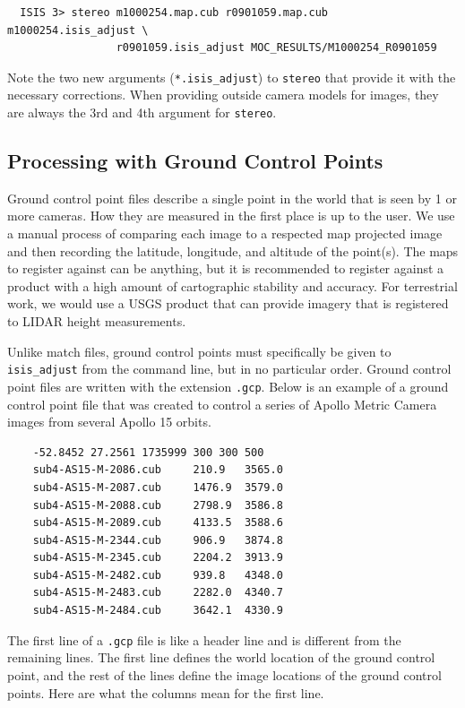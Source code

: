 \begin{verbatim}
  ISIS 3> stereo m1000254.map.cub r0901059.map.cub m1000254.isis_adjust \
                 r0901059.isis_adjust MOC_RESULTS/M1000254_R0901059
\end{verbatim}

Note the two new arguments (\texttt{*.isis\_adjust}) to
\texttt{stereo} that provide it with the necessary corrections. When
providing outside camera models for images, they are always the 3rd
and 4th argument for \texttt{stereo}.

\subsection{Processing with Ground Control Points}

Ground control point files describe a single point in the world
that is seen by 1 or more cameras. How they are measured in the
first place is up to the user. We use a manual process of comparing
each image to a respected map projected image and then recording
the latitude, longitude, and altitude of the point(s). The maps to
register against can be anything, but it is recommended to register
against a product with a high amount of cartographic stability and
accuracy.  For terrestrial work, we would use a \ac{USGS} product
that can provide imagery that is registered to LIDAR height
measurements.

Unlike match files, ground control points must specifically be given
to \texttt{isis\_adjust} from the command line, but in no particular
order. Ground control point files are written with the extension
\texttt{.gcp}. Below is an example of a ground control point file that
was created to control a series of Apollo Metric Camera images from
several Apollo 15 orbits.

\begin{verbatim}
    -52.8452 27.2561 1735999 300 300 500
    sub4-AS15-M-2086.cub     210.9   3565.0
    sub4-AS15-M-2087.cub     1476.9  3579.0
    sub4-AS15-M-2088.cub     2798.9  3586.8
    sub4-AS15-M-2089.cub     4133.5  3588.6
    sub4-AS15-M-2344.cub     906.9   3874.8
    sub4-AS15-M-2345.cub     2204.2  3913.9
    sub4-AS15-M-2482.cub     939.8   4348.0
    sub4-AS15-M-2483.cub     2282.0  4340.7
    sub4-AS15-M-2484.cub     3642.1  4330.9
\end{verbatim}

The first line of a \texttt{.gcp} file is like a header line and
is different from the remaining lines.  The first line defines the
world location of the ground control point, and the rest of the
lines define the image locations of the ground control points. Here
are what the columns mean for the first line.

